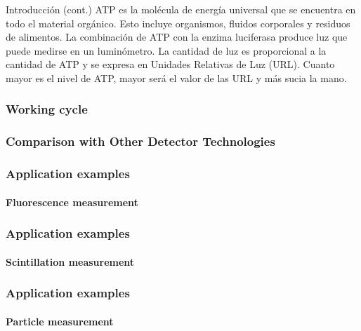 \documentclass{beamer}
\begin{document}
\begin{frame}
\begin{block}{Introducci\'on (cont.)}
ATP es la molécula de energía universal que se encuentra en todo el material
orgánico. Esto incluye organismos, fluidos corporales y
residuos de alimentos. La combinación de ATP con la enzima luciferasa produce
luz que puede medirse en un luminómetro. La
cantidad de luz es proporcional a la cantidad de ATP y se expresa en Unidades
Relativas de Luz (URL). Cuanto mayor es el nivel de
ATP, mayor será el valor de las URL y más sucia la mano.

\end{block}
\end{frame} 

\begin{frame}
\frametitle{Working cycle}
\begin{center}
\end{center}
\end{frame}

\begin{frame}
\frametitle{Comparison with Other Detector Technologies}
\begin{center}
\end{center}
\end{frame}

\begin{frame}
\frametitle{Application examples}
\framesubtitle{Fluorescence measurement}
\begin{center}
\end{center}
\end{frame}

\begin{frame}
\frametitle{Application examples}
\framesubtitle{Scintillation measurement}
\begin{center}
\end{center}
\end{frame}

\begin{frame}
\frametitle{Application examples}
\framesubtitle{Particle measurement}
\begin{center}
\end{center}
\end{frame}
\end{document}
